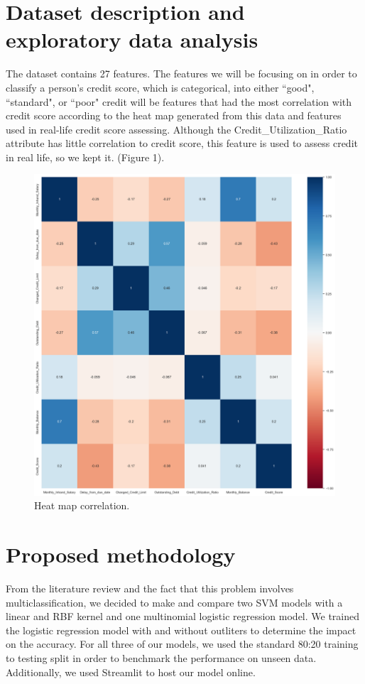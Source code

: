 \documentclass[conference, 11pt]{IEEEtran}
\begin{document}
\section{Dataset description and exploratory data analysis}
The dataset contains 27 features. The features we will be focusing on in order
to classify a person's credit score, which is categorical, into either ``good", ``standard", or ``poor" credit
will be features that had the most correlation with credit score according to the heat map
generated from this data and features used in real-life credit score assessing. Although the Credit\_Utilization\_Ratio attribute has little 
correlation to credit score, this feature is used to assess credit in real life, so we kept it. (Figure 1).
\begin{figure}[h]
    \begin{center}
    \includegraphics[width=\columnwidth]{images/credscoreheatmap.png}
    \caption{Heat map correlation.}
    \label{fig:figure1}
    \end{center}
\end{figure}
\section{Proposed methodology}
From the literature review and the fact that this problem involves multiclassification,
we decided to make and compare two SVM models with a linear and RBF kernel and one 
multinomial logistic regression model. We trained the logistic regression model with and without
outliters to determine the impact on the accuracy. For all three of our models, we used
the standard 80:20 training to testing split in order to benchmark the performance on unseen
data. Additionally, we used Streamlit to host our model online.
\end{document}
